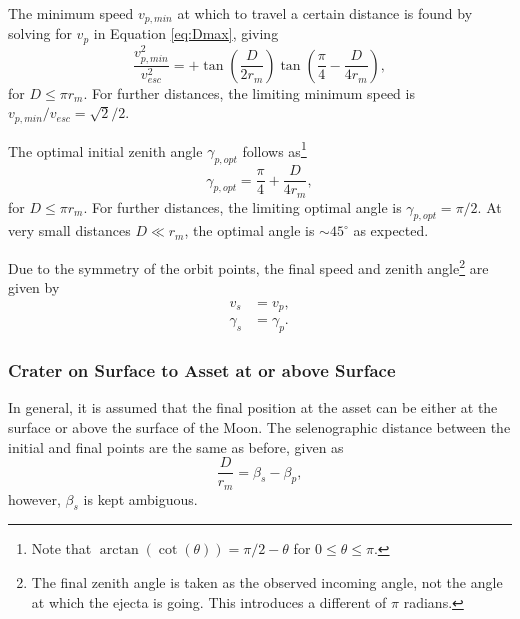 \documentclass{article}
\begin{document}
The minimum speed $v_{p,min}$ at which to travel a certain distance is found by solving for $v_p$ in Equation \eqref{eq:Dmax}, giving
\begin{equation}\label{eq:vpmin_special}
\frac{v_{p,min}^2}{v_{esc}^2} = +\tan\left(\frac{D}{2r_m}\right)\tan\left(\frac{\pi}{4}- \frac{D}{4r_m}\right),
\end{equation}
for $D \le \pi r_m$. For further distances, the limiting minimum speed is $v_{p,min}/v_{esc} = \sqrt{2}/2$.

The optimal initial zenith angle $\gamma_{p,opt}$ follows as\footnote{Note that $\arctan(\cot(\theta)) = \pi/2 - \theta$ for $0 \le \theta \le \pi$.}
\begin{equation}
\gamma_{p,opt} = \frac{\pi}{4} + \frac{D}{4r_m},
\end{equation}
for $D \le \pi r_m$. For further distances, the limiting optimal angle is $\gamma_{p,opt} = \pi/2$. At very small distances $D \ll r_m$, the optimal angle is $\sim 45^\circ$ as expected.

Due to the symmetry of the orbit points, the final speed and zenith angle\footnote{The final zenith angle is taken as the observed incoming angle, not the angle at which the ejecta is going. This introduces a different of $\pi$ radians.} are given by
\begin{align}
v_s &= v_p,\\
\gamma_s &= \gamma_p.
\end{align}



\subsubsection{Crater on Surface to Asset at or above Surface}\label{sssec:Crater on Surface to Observer at or above Surface}

In general, it is assumed that the final position at the asset can be either at the surface or above the surface of the Moon. The selenographic distance between the initial and final points are the same as before, given as
\begin{equation}\label{eq:D_beta_gen}
\frac{D}{r_m} = \beta_s - \beta_p,
\end{equation}
however, $\beta_s$ is kept ambiguous.
\end{document}
